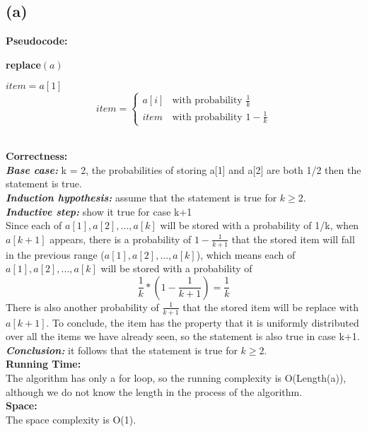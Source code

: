 \documentclass[twoside]{homework}
\begin{document}
\subsection*{(a)}
\textbf{Pseudocode:} \quad
\begin{algorithm}
	\caption*{\textbf{replace$(a)$}}
	\begin{algorithmic}
		\STATE $item=a[1]$
		\STATE $$item= \begin{cases}
		a[i] & \text{with probability $\frac{1}{k}$}\\
		item & \text{with probability $1-\frac{1}{k}$}
		\end{cases}$$
		\ENDFOR
	\end{algorithmic}		
\end{algorithm}
\\\textbf{Correctness:} \quad
\\\textbf{\emph{Base case:}}  k = 2, the probabilities of storing a[1] and a[2] are both 1/2 then the statement is true.
\\\textbf{\emph{Induction hypothesis:}} assume that the statement is true for $k\ge 2$.
\\\textbf{\emph{Inductive step:}} show it true for case k+1
\\Since each of $a[1],a[2],...,a[k]$ will be stored with a probability of 1/k, when $a[k+1]$ appears, there is a probability of $1-\frac{1}{k+1}$ that the stored item will fall in the previous range ($a[1],a[2],...,a[k]$), which means each of $a[1],a[2],...,a[k]$ will be stored with a probability of $$\frac{1}{k}*(1-\frac{1}{k+1})=\frac{1}{k}$$
There is also another probability of $\frac{1}{k+1}$ that the stored item will be replace with $a[k+1]$. To conclude, the item has the property that it is uniformly distributed over all the items we have already seen, so the statement is also true in case k+1.
\\\textbf{\emph{Conclusion:}} 
it follows that the statement is true for $k\ge 2$.
\\\textbf{Running Time:} \quad
\\The algorithm has only a for loop, so the running complexity is O(Length(a)), although we do not know the length in the process of the algorithm.
\\\textbf{Space:} \quad
\\The space complexity is O(1).
\end{document}
